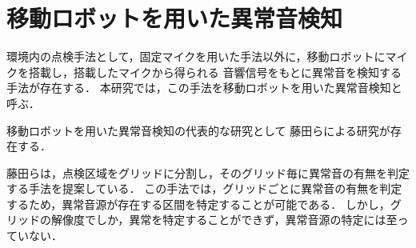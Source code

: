 \documentclass[../main]{subfiles}
\begin{document}
\section{移動ロボットを用いた異常音検知}
\label{sec:intro_my_purpose}

環境内の点検手法として，固定マイクを用いた手法以外に，移動ロボットにマイクを搭載し，搭載したマイクから得られる
音響信号をもとに異常音を検知する手法が存在する．
本研究では，この手法を移動ロボットを用いた異常音検知と呼ぶ．

移動ロボットを用いた異常音検知の代表的な研究として
藤田らによる研究が存在する．

藤田らは，点検区域をグリッドに分割し，そのグリッド毎に異常音の有無を判定する手法を提案している．
この手法では，グリッドごとに異常音の有無を判定するため，異常音源が存在する区間を特定することが可能である．
しかし，グリッドの解像度でしか，異常を特定することができず，異常音源の特定には至っていない．
\end{document}
